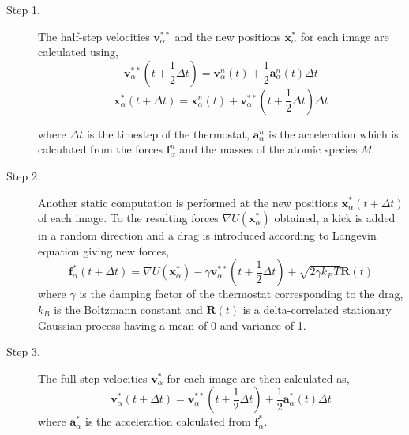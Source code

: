\documentclass{article}
\begin{document}
\begin{description}
\item[Step 1.] The half-step velocities $\bm{v}_{\alpha}^{**}$ and the new positions $\bm{x}_{\alpha}^*$ for each image are calculated using,
%
\begin{equation} \label{eq:14}
\bm{v}_{\alpha}^{**}\left(t + \dfrac{1}{2}\Delta t\right) = \bm{v} _{\alpha}^n(t) + \dfrac{1}{2}\bm{a}_{\alpha}^n(t)\Delta t
\end{equation}
%
%
\begin{equation} \label{eq:15}
\bm{x}_{\alpha}^*(t + \Delta t) = \bm{x}_{\alpha}^n(t) + \bm{v}_{\alpha}^{**}\left(t + \dfrac{1}{2}\Delta t\right)\Delta t
\end{equation}
%

where $\Delta t$ is the timestep of the thermostat, $\bm{a}_{\alpha}^n$ is the acceleration which is calculated from the forces $\bm{f}_{\alpha}^n$ and the masses of the atomic species $M$.
\end{description}

\begin{description}
\item[Step 2.] Another static computation is performed at the new positions $\bm{x}_{\alpha}^*(t + \Delta t)$ of each image. To the resulting forces $\nabla U(\bm{x}_{\alpha}^*)$ obtained, a kick is added in a random direction and a drag is introduced according to Langevin equation \cite{Schlick2010} giving new forces,
%
\begin{equation} \label{eq:16}
\bm{f}_{\alpha}^*(t + \Delta t) = \nabla U(\bm{x}_{\alpha}^*) - \gamma \bm{v}_{\alpha}^{**}\left(t + \dfrac{1}{2}\Delta t\right)+ \sqrt{2\gamma k_BT}\bm{R}(t)
\end{equation}
%
where $\gamma$ is the damping factor of the thermostat corresponding to the drag, $k_B$ is the Boltzmann constant and $\bm{R}(t)$ is a delta-correlated stationary Gaussian process having a mean of 0 and variance of 1.
\end{description}

\begin{description}
\item[Step 3.] The full-step velocities $\bm{v}_{\alpha}^*$ for each image are then calculated as,
%
\begin{equation} \label{eq:17}
\bm{v}_{\alpha}^*(t + \Delta t) = \bm{v}_{\alpha}^{**}\left(t + \dfrac{1}{2}\Delta t\right) + \dfrac{1}{2}\bm{a}_{\alpha}^*(t)\Delta t
\end{equation}
%
\indent where $\bm{a}_{\alpha}^*$ is the acceleration calculated from $\bm{f}_{\alpha}^*$.
\end{description}
\end{document}
